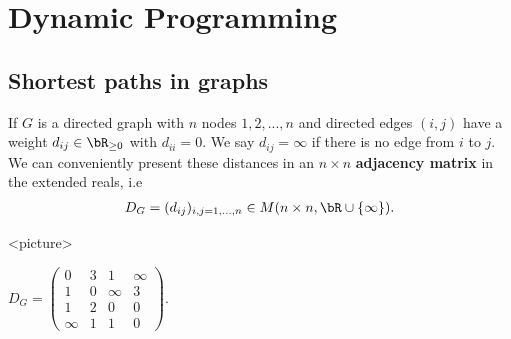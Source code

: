 \section{Dynamic Programming}

\subsection{Shortest paths in graphs}
If $G$ is a directed graph with $n$ nodes $1,2,...,n$ and directed edges $(i,j)$ have a weight $d_{ij} \in \bR_{\geq 0}$ with $d_{ii} = 0$. We say $d_{ij} = \infty$ if there is no edge from $i$ to $j$. We can conveniently present these distances in an $n \times n$ \textbf{adjacency matrix} in the extended reals, i.e
\begin{align*}
  D_G = (d_{ij})_{i,j = 1,...,n} \in M(n\times n, \bR\cup \{\infty\}).
\end{align*}
\begin{example}\label{example:directed-graph}
  <picture>

  $D_G = 
  \begin{pmatrix}	
    0 & 3 & 1 & \infty \\
    1 & 0 & \infty & 3 \\
    1 & 2 & 0 & 0 \\
    \infty & 1 & 1 & 0
  \end{pmatrix}$.
\end{example}

